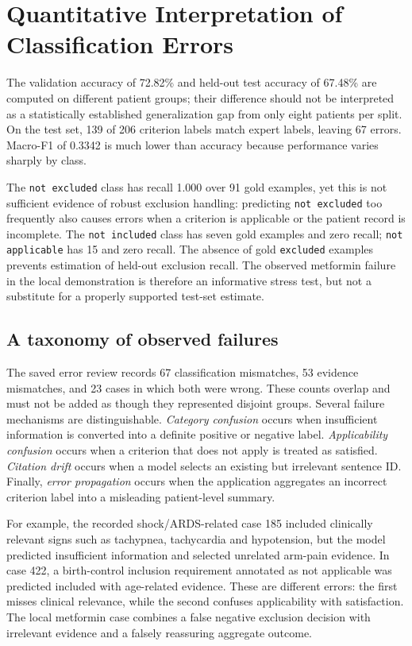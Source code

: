 \documentclass[conference]{IEEEtran}
\begin{document}
\section{Quantitative Interpretation of Classification Errors}
The validation accuracy of 72.82\% and held-out test accuracy of 67.48\% are computed on different patient groups; their difference should not be interpreted as a statistically established generalization gap from only eight patients per split. On the test set, 139 of 206 criterion labels match expert labels, leaving 67 errors. Macro-F1 of 0.3342 is much lower than accuracy because performance varies sharply by class.

The \texttt{not excluded} class has recall 1.000 over 91 gold examples, yet this is not sufficient evidence of robust exclusion handling: predicting \texttt{not excluded} too frequently also causes errors when a criterion is applicable or the patient record is incomplete. The \texttt{not included} class has seven gold examples and zero recall; \texttt{not applicable} has 15 and zero recall. The absence of gold \texttt{excluded} examples prevents estimation of held-out exclusion recall. The observed metformin failure in the local demonstration is therefore an informative stress test, but not a substitute for a properly supported test-set estimate.

\subsection{A taxonomy of observed failures}
The saved error review records 67 classification mismatches, 53 evidence mismatches, and 23 cases in which both were wrong. These counts overlap and must not be added as though they represented disjoint groups. Several failure mechanisms are distinguishable. \emph{Category confusion} occurs when insufficient information is converted into a definite positive or negative label. \emph{Applicability confusion} occurs when a criterion that does not apply is treated as satisfied. \emph{Citation drift} occurs when a model selects an existing but irrelevant sentence ID. Finally, \emph{error propagation} occurs when the application aggregates an incorrect criterion label into a misleading patient-level summary.

For example, the recorded shock/ARDS-related case 185 included clinically relevant signs such as tachypnea, tachycardia and hypotension, but the model predicted insufficient information and selected unrelated arm-pain evidence. In case 422, a birth-control inclusion requirement annotated as not applicable was predicted included with age-related evidence. These are different errors: the first misses clinical relevance, while the second confuses applicability with satisfaction. The local metformin case combines a false negative exclusion decision with irrelevant evidence and a falsely reassuring aggregate outcome.
\end{document}

